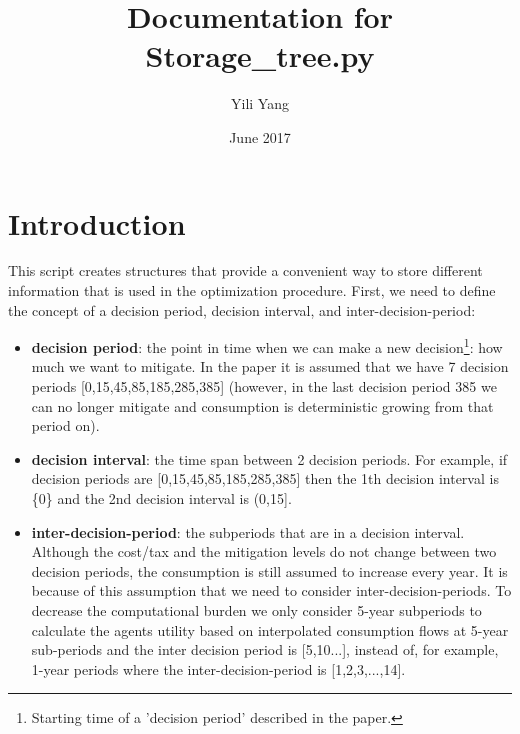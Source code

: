 \documentclass[12pt]{article}
\title{Documentation for Storage\_tree.py}
\author{Yili Yang}
\date{June 2017}
\begin{document}
\maketitle

\section{Introduction}
This script creates structures that provide a convenient way to store different information that is used in the optimization procedure. First, we need to define the concept of a decision period, decision interval, and inter-decision-period:
\begin{itemize}
    \item \textbf{decision period}: the point in time when we can make a new decision\footnote{Starting time of a 'decision period' described in the paper.}: how much we want to mitigate. In the paper it is assumed that we have 7 decision periods [0,15,45,85,185,285,385] (however, in the last decision period 385 we can no longer mitigate and consumption is deterministic growing from that period on).

    \item \textbf{decision interval}: the time span between 2 decision periods. For example, if decision periods are [0,15,45,85,185,285,385] then the 1th decision interval is \{0\} and the 2nd decision interval is (0,15].

    \item \textbf{inter-decision-period}: the subperiods that are in a decision interval. Although the cost/tax and the mitigation levels do not change between two decision periods, the consumption is still assumed to increase every year. It is because of this assumption that we need to consider inter-decision-periods. To decrease the computational burden we only consider 5-year subperiods to calculate the agents utility based on interpolated consumption flows at 5-year sub-periods and the inter decision period is [5,10...], instead of, for example, 1-year periods where the inter-decision-period is [1,2,3,...,14].
\end{itemize}
\end{document}

